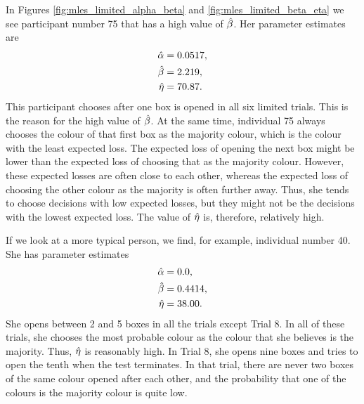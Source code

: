 In Figures \ref{fig:mles_limited_alpha_beta} and \ref{fig:mles_limited_beta_eta} we see participant number 75 that has a high value of $\hat{\beta}$. Her parameter estimates are
\begin{equation}
\label{mles_lim_person75}
    \begin{aligned}
        \hat{\alpha} &= 0.0517,\\
        \hat{\beta} &= 2.219,\\
        \hat{\eta} &= 70.87.
    \end{aligned}
\end{equation}
This participant chooses after one box is opened in all six limited trials. This is the reason for the high value of $\hat{\beta}$. At the same time, individual 75 always chooses the colour of that first box as the majority colour, which is the colour with the least expected loss. The expected loss of opening the next box might be lower than the expected loss of choosing that as the majority colour. However, these expected losses are often close to each other, whereas the expected loss of choosing the other colour as the majority is often further away. Thus, she tends to choose decisions with low expected losses, but they might not be the decisions with the lowest expected loss. The value of $\hat{\eta}$ is, therefore, relatively high.

If we look at a more typical person, we find, for example, individual number 40. She has parameter estimates
\begin{equation}
\label{mles_lim_person40}
    \begin{aligned}
        \hat{\alpha} &= 0.0,\\
        \hat{\beta} &= 0.4414,\\
        \hat{\eta} &= 38.00.
    \end{aligned}
\end{equation}
She opens between 2 and 5 boxes in all the trials except Trial 8. In all of these trials, she chooses the most probable colour as the colour that she believes is the majority. Thus, $\hat{\eta}$ is reasonably high. In Trial 8, she opens nine boxes and tries to open the tenth when the test terminates. In that trial, there are never two boxes of the same colour opened after each other, and the probability that one of the colours is the majority colour is quite low. 

